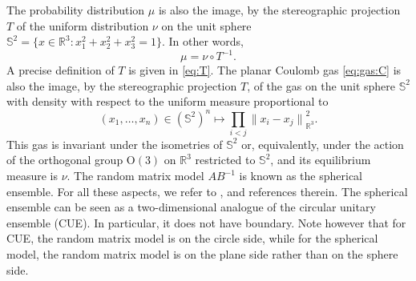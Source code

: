 \documentclass[10pt,reqno]{amsart}
\numberwithin{equation}{section}
\numberwithin{figure}{section}
\theoremstyle{plain}
\newcommand{\<}{\langle}
\renewcommand{\>}{\rangle}
\begin{document}
The probability distribution $\mu$ is also the image, by the stereographic projection $T$ of the uniform distribution $\nu$ on the unit sphere
$\mathbb{S}^2=\{x\in\mathbb{R}^3:x_1^2+x_2^2+x_3^2=1\}$. In other words,
\begin{equation}
  \mu=\nu\circ T^{-1}.
\end{equation}
A precise definition of $T$ is given in \eqref{eq:T}. The planar Coulomb gas \eqref{eq:gas:C} is also the image, by the stereographic projection $T$, of the gas on the unit sphere $\mathbb{S}^2$
with density with respect to the uniform measure proportional to
\begin{equation}\label{eq:gas:S}
  (x_1,\ldots,x_n)\in(\mathbb{S}^2)^n
  \mapsto\prod_{i<j}{\|x_i-x_j\|}_{\mathbb{R}^3}^2.
\end{equation}
This gas is invariant under 
the isometries of $\mathbb S^2$ or, equivalently, under the action of the orthogonal group
$\mathrm{O}(3)$ on $\mathbb R^3$
restricted to $\mathbb S^2$, and its equilibrium measure is $\nu$. The random matrix model
$AB^{-1}$ is known as the spherical ensemble. For all these aspects, we refer
to \cite[Chapter 4]{MR2552864}, \cite{MR2641363} and references therein. The spherical ensemble can be seen as a two-dimensional analogue of the circular unitary ensemble (CUE). In particular, it does not have boundary. Note however that for CUE, the random matrix model is on the circle side, while for the spherical model, the random matrix model is on the plane side rather than on the sphere side.
\end{document}
